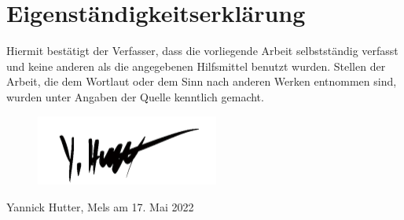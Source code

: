 \documentclass[12pt, oneside]{article}
\begin{document}
\clearpage
\section*{Eigenständigkeitserklärung}
Hiermit bestätigt der Verfasser, dass die vorliegende Arbeit selbstständig verfasst und keine anderen als die angegebenen Hilfsmittel benutzt wurden. Stellen der Arbeit, die dem Wortlaut oder dem Sinn nach anderen Werken entnommen sind, wurden unter Angaben der Quelle kenntlich gemacht.

\begin{figure}[ht]
	\includegraphics[width=6cm]{images/signature.png}
\end{figure}
Yannick Hutter, Mels am 17. Mai 2022
\end{document}
